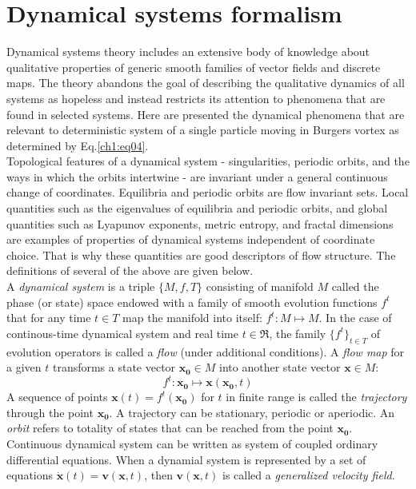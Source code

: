 \documentclass[../main.tex]{subfiles}
\begin{document}
\section{Dynamical systems formalism}
\label{ch2s2}
Dynamical systems theory includes an extensive body of
knowledge about qualitative properties of generic smooth
families of vector fields and discrete maps. The theory abandons the goal of describing the qualitative dynamics of all systems as hopeless and instead restricts its attention to phenomena that are found in selected systems. Here are presented the dynamical phenomena that are relevant to deterministic system of a single particle moving in Burgers vortex as determined by Eq.\ref{ch1:eq04}.\\
Topological features of a dynamical system - singularities, periodic orbits, and the ways in which the orbits intertwine - are invariant under a general continuous change of coordinates. Equilibria and periodic orbits are flow invariant sets. Local quantities such as the eigenvalues of equilibria and periodic orbits, and global quantities such as Lyapunov exponents, metric entropy, and fractal dimensions are examples of properties of dynamical systems independent of coordinate choice. That is why these quantities are good descriptors of flow structure. The definitions of several of the above are given below.\\
A \emph{dynamical system} is a triple $\{M,f,T\}$ consisting of manifold $M$ called the phase (or state) space endowed with a family of smooth evolution functions $f^t$ that for any time $t \in T$ map the manifold into itself: $f^t : M \mapsto M$. In the case of continous-time dynamical system and real time $t \in \Re$, the family $\{f^t\}_{t\in T}$ of evolution operators is called a \emph{flow} (under additional conditions). A \emph{flow map} for a given $t$ transforms a state vector $\mathbf{x_0} \in M$ into another state vector $\mathbf{x} \in M$:
\begin{equation}
f^t : \mathbf{x_0} \mapsto \mathbf{x}(\mathbf{x_0},t)
\label{def:flowmap}
\end{equation}
A sequence of points $\mathbf{x}(t) = f^t(\mathbf{x_0})$ for $t$ in finite range is called the \emph{trajectory} through the point $\mathbf{x_0}$. A trajectory can be stationary, periodic or aperiodic. An \emph{orbit} refers to totality of states that can be reached from the point $\mathbf{x_0}$.\\
Continuous dynamical system can be written as system of coupled ordinary differential equations. When a dynamial system is represented by a set of equations $\dot{\mathbf{x}}(t)=\mathbf{v}(\mathbf{x},t)$, then $\mathbf{v}(\mathbf{x},t)$ is called a \emph{generalized velocity field}.\\
\end{document}
